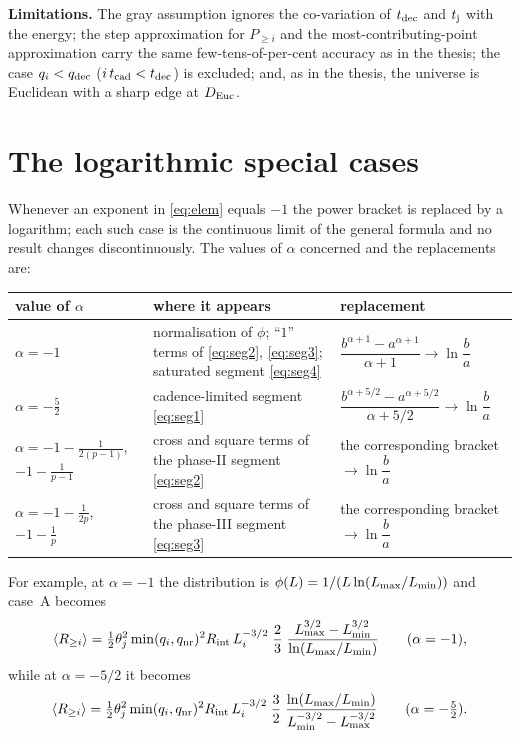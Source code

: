 \documentclass[11pt,a4paper]{article}
\newcommand{\Euc}{{\rm Euc}}
\newcommand{\dec}{{\rm dec}}
\newcommand{\nr}{{\rm nr}}
\newcommand{\Rint}{R_{\rm int}}
\newcommand{\tcad}{t_{\rm cad}}
\newcommand{\tdec}{t_{\rm dec}}
\newcommand{\tj}{t_{\rm j}}
\newcommand{\Ravg}{\langle R_{\geq i}\rangle}
\newcommand{\Lmin}{L_{\rm min}}
\newcommand{\Lmax}{L_{\rm max}}
\begin{document}
\noindent\textbf{Limitations.} The gray assumption ignores the co-variation of $\tdec$ and $\tj$ with the energy; the step approximation for $P_{\geq i}$ and the most-contributing-point approximation carry the same few-tens-of-per-cent accuracy as in the thesis; the case $q_i<q_\dec$ ($i\,\tcad<\tdec$) is excluded; and, as in the thesis, the universe is Euclidean with a sharp edge at $D_\Euc$.

\appendix

\section{The logarithmic special cases}
\label{app:logs}

Whenever an exponent in \eqref{eq:elem} equals $-1$ the power bracket is replaced by a logarithm; each such case is the continuous limit of the general formula and no result changes discontinuously. The values of $\alpha$ concerned and the replacements are:

\begin{center}\small
\renewcommand{\arraystretch}{1.4}
\begin{tabular}{l p{5.4cm} l}
\toprule
value of $\alpha$ & where it appears & replacement \\
\midrule
$\alpha=-1$ & normalisation of $\phi$; ``$1$'' terms of \eqref{eq:seg2}, \eqref{eq:seg3}; saturated segment \eqref{eq:seg4} & $\dfrac{b^{\alpha+1}-a^{\alpha+1}}{\alpha+1}\to\ln\dfrac{b}{a}$ \\
$\alpha=-\tfrac52$ & cadence-limited segment \eqref{eq:seg1} & $\dfrac{b^{\alpha+5/2}-a^{\alpha+5/2}}{\alpha+5/2}\to\ln\dfrac{b}{a}$ \\
$\alpha=-1-\tfrac{1}{2(p-1)}$,\ $-1-\tfrac{1}{p-1}$ & cross and square terms of the phase-II segment \eqref{eq:seg2} & the corresponding bracket $\to\ln\dfrac{b}{a}$ \\
$\alpha=-1-\tfrac{1}{2p}$,\ $-1-\tfrac{1}{p}$ & cross and square terms of the phase-III segment \eqref{eq:seg3} & the corresponding bracket $\to\ln\dfrac{b}{a}$ \\
\bottomrule
\end{tabular}
\end{center}

\noindent For example, at $\alpha=-1$ the distribution is $\phi(L)=1/(L\ln(\Lmax/\Lmin))$ and case~A becomes
\[
\Ravg=\tfrac12\theta_j^2\min(q_i,q_\nr)^2\Rint\,L_i^{-3/2}\;\frac{2}{3}\;\frac{\Lmax^{3/2}-\Lmin^{3/2}}{\ln(\Lmax/\Lmin)}\qquad(\alpha=-1),
\]
while at $\alpha=-5/2$ it becomes
\[
\Ravg=\tfrac12\theta_j^2\min(q_i,q_\nr)^2\Rint\,L_i^{-3/2}\;\frac{3}{2}\;\frac{\ln(\Lmax/\Lmin)}{\Lmin^{-3/2}-\Lmax^{-3/2}}\qquad(\alpha=-\tfrac52).
\]
\end{document}
